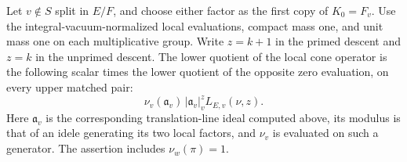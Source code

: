 \begin{proposition}
\label{tpd:ordinary}
Let \(v\notin S\) split in \(E/F\), and choose either factor as
the first copy of \(K_0=F_v\). Use the integral-vacuum-normalized
local evaluations, compact mass one, and unit mass one on each
multiplicative group. Write \(z=k+1\) in the primed descent and
\(z=k\) in the unprimed descent. The lower quotient of the local
cone operator is the following scalar times the lower quotient of
the opposite zero evaluation, on every upper matched pair:
\[
   \nu_v(\mathfrak a_v)\,|\mathfrak a_v|_v^z L_{E,v}(\nu,z).
\]
Here \(\mathfrak a_v\) is the corresponding translation-line ideal
computed above, its modulus is that of an idele generating its two
local factors, and \(\nu_v\) is evaluated on such a generator.
The assertion includes \(\nu_w(\pi)=1\).
\end{proposition}
